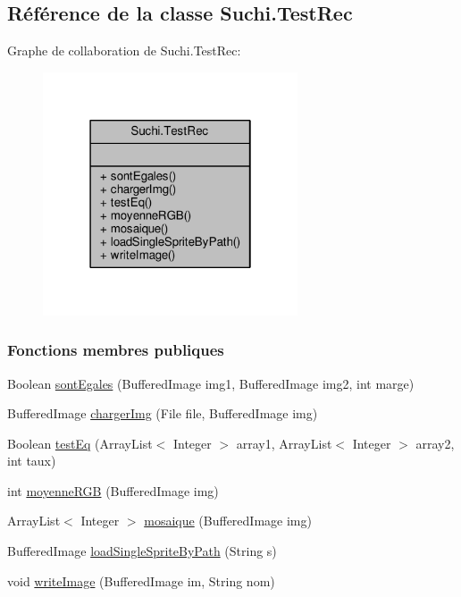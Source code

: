 \hypertarget{classSuchi_1_1TestRec}{}\subsection{Référence de la classe Suchi.\+Test\+Rec}
\label{classSuchi_1_1TestRec}


Graphe de collaboration de Suchi.\+Test\+Rec\+:\nopagebreak
\begin{figure}[H]
\begin{center}
\leavevmode
\includegraphics[width=214pt]{classSuchi_1_1TestRec__coll__graph}
\end{center}
\end{figure}
\subsubsection*{Fonctions membres publiques}
\begin{DoxyCompactItemize}
\item 
Boolean \hyperlink{classSuchi_1_1TestRec_a570da66c6ed329bbd9c8b767a4560542}{sont\+Egales} (Buffered\+Image img1, Buffered\+Image img2, int marge)
\item 
Buffered\+Image \hyperlink{classSuchi_1_1TestRec_a61f08e46fe8bfe7362f4b075691e2e67}{charger\+Img} (File file, Buffered\+Image img)
\item 
Boolean \hyperlink{classSuchi_1_1TestRec_acd12184a487bee6f847723de48d09492}{test\+Eq} (Array\+List$<$ Integer $>$ array1, Array\+List$<$ Integer $>$ array2, int taux)
\item 
int \hyperlink{classSuchi_1_1TestRec_a01eef119259a33691e26e5d388bd5ee9}{moyenne\+R\+G\+B} (Buffered\+Image img)
\item 
Array\+List$<$ Integer $>$ \hyperlink{classSuchi_1_1TestRec_a91c2f89fba32d1a568b41fd69c537598}{mosaique} (Buffered\+Image img)
\item 
Buffered\+Image \hyperlink{classSuchi_1_1TestRec_ab6006dc92d773f5414f425b9112ab914}{load\+Single\+Sprite\+By\+Path} (String s)
\item 
void \hyperlink{classSuchi_1_1TestRec_ad35d3b645c04b24038244ebfebd397c8}{write\+Image} (Buffered\+Image im, String nom)
\end{DoxyCompactItemize}


